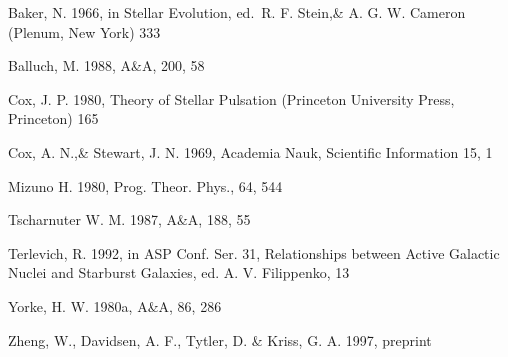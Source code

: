 \documentclass{aa}
\begin{document}
\begin{thebibliography}{}

   Baker, N. 1966,
      in Stellar Evolution,
      ed.\ R. F. Stein,\& A. G. W. Cameron
      (Plenum, New York) 333

    Balluch, M. 1988,
      A\&A, 200, 58

    Cox, J. P. 1980,
      Theory of Stellar Pulsation
      (Princeton University Press, Princeton) 165

    Cox, A. N.,\& Stewart, J. N. 1969,
      Academia Nauk, Scientific Information 15, 1

    Mizuno H. 1980,
      Prog. Theor. Phys., 64, 544
   
    Tscharnuter W. M. 1987,
      A\&A, 188, 55
  
    Terlevich, R. 1992, in ASP Conf. Ser. 31, 
      Relationships between Active Galactic Nuclei and Starburst Galaxies, 
      ed. A. V. Filippenko, 13

    Yorke, H. W. 1980a,
      A\&A, 86, 286

    Zheng, W., Davidsen, A. F., Tytler, D. \& Kriss, G. A.
      1997, preprint
\end{thebibliography}
\end{document}
